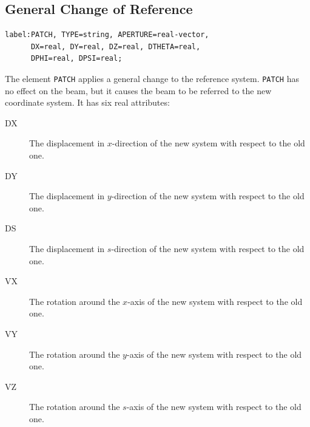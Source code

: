 \subsection{General Change of Reference}
\label{sec:patch}
\begin{verbatim}
label:PATCH, TYPE=string, APERTURE=real-vector,
      DX=real, DY=real, DZ=real, DTHETA=real,
      DPHI=real, DPSI=real;
\end{verbatim}
The element \texttt{PATCH} applies a general change to the reference system. 
\texttt{PATCH} has no effect on the beam,
but it causes the beam to be referred to the new coordinate system.
It has six real attributes:
\begin{description}
\item[DX]
  The displacement in $x$-direction of the new system with respect to the old
  one. 
\item[DY]
  The displacement in $y$-direction of the new system with respect to the old
  one. 
\item[DS]
  The displacement in $s$-direction of the new system with respect to the old
  one. 
\item[VX]
  The rotation around the $x$-axis of the new system with respect to the old
  one. 
\item[VY]
  The rotation around the $y$-axis of the new system with respect to the old
  one. 
\item[VZ]
  The rotation around the $s$-axis of the new system with respect to the old
  one. 
\end{description}

